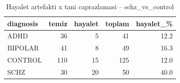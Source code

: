 \begin{table}[htbp]
  \centering
  \caption{Hayalet artefakti x tani caprazlamasi -- schz\_vs\_control}
  \label{tab:ghost_schz_vs_control}
  \small
  \begin{tabular}{lrrrr}
    \toprule
    diagnosis & temiz & hayalet & toplam & hayalet\_\% \\
    \midrule
    ADHD & 36 & 5 & 41 & 12.2 \\
    BIPOLAR & 41 & 8 & 49 & 16.3 \\
    CONTROL & 110 & 15 & 125 & 12.0 \\
    SCHZ & 30 & 20 & 50 & 40.0 \\
    \bottomrule
  \end{tabular}
\end{table}
